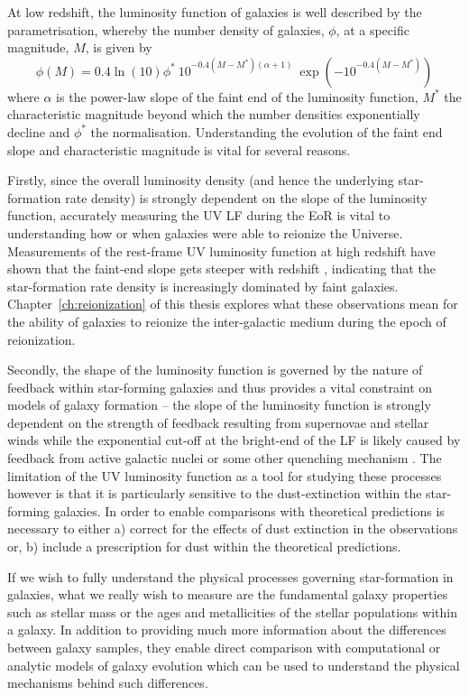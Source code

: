 At low redshift, the luminosity function of galaxies is well described by the \citet{Schechter:1976gl} parametrisation, whereby the number density of galaxies, $\phi$, at a specific magnitude, $M$, is given by
\begin{equation}
	\phi(M) = 0.4 \ln(10) \phi^{*} ~ 10^{-0.4(M-M^{*})(\alpha+1)} ~ \exp(-10^{-0.4(M-M^{*})})	
\end{equation}
where $\alpha$ is the power-law slope of the faint end of the luminosity function, $M^{*}$ the characteristic magnitude beyond which the number densities exponentially decline and $\phi^{*}$ the normalisation. Understanding the evolution of the faint end slope and characteristic magnitude is vital for several reasons.

Firstly, since the overall luminosity density (and hence the underlying star-formation rate density) is strongly dependent on the slope of the luminosity function, accurately measuring the UV LF during the EoR is vital to understanding how or when galaxies were able to reionize the Universe. Measurements of the rest-frame UV luminosity function at high redshift have shown that the faint-end slope gets steeper with redshift \citep{2007ApJ...670..928B,2015ApJ...803...34B,Finkelstein:2014ub}, indicating that the star-formation rate density is increasingly dominated by faint galaxies. Chapter~\ref{ch:reionization} of this thesis explores what these observations mean for the ability of galaxies to reionize the inter-galactic medium during the epoch of reionization.

Secondly, the shape of the luminosity function is governed by the nature of feedback within star-forming galaxies and thus provides a vital constraint on models of galaxy formation \citep{2006MNRAS.370..645B} -- the slope of the luminosity function is strongly dependent on the strength of feedback resulting from supernovae and stellar winds while the exponential cut-off at the bright-end of the LF is likely caused by feedback from active galactic nuclei or some other quenching mechanism \citep{Benson:2003ch,Peng:2010gn}. The limitation of the UV luminosity function as a tool for studying these processes however is that it is particularly sensitive to the dust-extinction within the star-forming galaxies. In order to enable comparisons with theoretical predictions is necessary to either a) correct for the effects of dust extinction in the observations or, b) include a prescription for dust within the theoretical predictions.

If we wish to fully understand the physical processes governing star-formation in galaxies, what we really wish to measure are the fundamental galaxy properties such as stellar mass or the ages and metallicities of the stellar populations within a galaxy. In addition to providing much more information about the differences between galaxy samples, they enable direct comparison with computational or analytic models of galaxy evolution which can be used to understand the physical mechanisms behind such differences.

